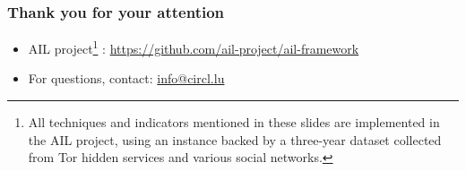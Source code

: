 \documentclass[10pt,aspectratio=169, colorlinks=true, linkcolor=circlBlue]{beamer}
\begin{document}
\begin{frame}
	\frametitle{Thank you for your attention}
	\begin{itemize}
		\item AIL project\footnote{All techniques and indicators mentioned in these slides are implemented in the AIL project, using an instance backed by a three-year dataset collected from Tor hidden services and various social networks.}
: \url{https://github.com/ail-project/ail-framework}
		\item For questions, contact: \href{mailto:info@circl.lu}{info@circl.lu}
	\end{itemize}
\end{frame}
\end{document}
